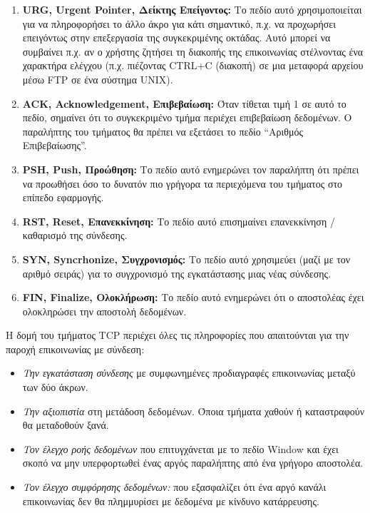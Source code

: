 \begin{itemize}
\begin{enumerate}
\item \textbf{URG, Urgent Pointer, Δείκτης Επείγοντος:} Το πεδίο αυτό χρησιμοποιείται για να πληροφορήσει το άλλο άκρο για κάτι σημαντικό, π.χ. να προχωρήσει επειγόντως στην επεξεργασία της συγκεκριμένης οκτάδας. Αυτό μπορεί να συμβαίνει π.χ. αν ο χρήστης ζητήσει τη διακοπής της επικοινωνίας στέλνοντας ένα χαρακτήρα ελέγχου (π.χ. πιέζοντας CTRL+C (διακοπή) σε μια μεταφορά αρχείου μέσω FTP σε ένα σύστημα UNIX).
\item \textbf{ACK, Acknowledgement, Επιβεβαίωση:} Όταν τίθεται τιμή 1 σε αυτό το πεδίο, σημαίνει ότι το συγκεκριμένο τμήμα περιέχει επιβεβαίωση δεδομένων. Ο παραλήπτης του τμήματος θα πρέπει να εξετάσει το πεδίο ``Αριθμός Επιβεβαίωσης''.
\item \textbf{PSH, Push, Προώθηση:} Το πεδίο αυτό ενημερώνει τον παραλήπτη ότι πρέπει να προωθήσει όσο το δυνατόν πιο γρήγορα τα περιεχόμενα του τμήματος στο επίπεδο εφαρμογής. 
\item \textbf{RST, Reset, Επανεκκίνηση:} Το πεδίο αυτό επισημαίνει επανεκκίνηση / καθαρισμό της σύνδεσης.
\item \textbf{SYN, Syncrhonize, Συγχρονισμός:} Το πεδίο αυτό χρησιμεύει (μαζί με τον αριθμό σειράς) για το συγχρονισμό της εγκατάστασης μιας νέας σύνδεσης.
\item \textbf{FIN, Finalize, Ολοκλήρωση:} Το πεδίο αυτό ενημερώνει ότι ο αποστολέας έχει ολοκληρώσει την αποστολή δεδομένων.
\end{enumerate}
\end{itemize}

Η δομή του τμήματος TCP περιέχει όλες τις πληροφορίες που απαιτούνται για την παροχή επικοινωνίας με σύνδεση:

\begin{itemize}
\item \emph{Την εγκατάσταση σύνδεσης} με συμφωνημένες προδιαγραφές επικοινωνίας μεταξύ των δύο άκρων.
\item \emph{Την αξιοπιστία} στη μετάδοση δεδομένων. Όποια τμήματα χαθούν ή καταστραφούν θα μεταδοθούν ξανά.
\item \emph{Τον έλεγχο ροής δεδομένων} που επιτυγχάνεται με το πεδίο Window και έχει σκοπό να μην υπερφορτωθεί ένας αργός παραλήπτης από ένα γρήγορο αποστολέα.
\item \emph{Τον έλεγχο συμφόρησης δεδομένων:} που εξασφαλίζει ότι ένα αργό κανάλι επικοινωνίας δεν θα πλημμυρίσει με δεδομένα με κίνδυνο κατάρρευσης.
\end{itemize} 